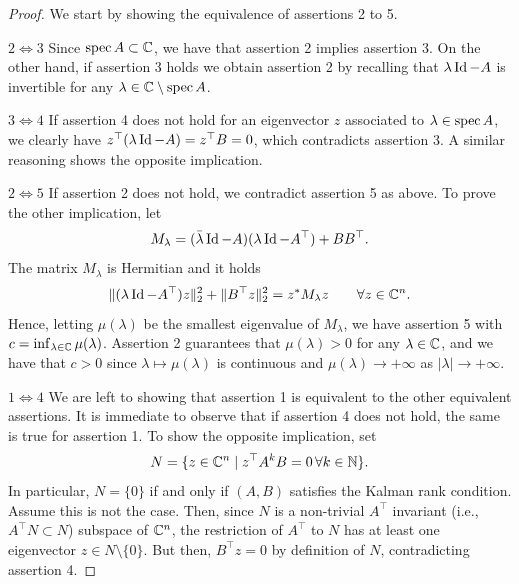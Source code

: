\begin{proof}
    We start by showing the equivalence of assertions 2 to 5.

    \emph{$2\iff 3$} Since $\operatorname{spec} A \subset \mathbb{C}$, we have that assertion 2 implies assertion 3.
    On the other hand, if assertion 3 holds we obtain assertion 2 by recalling that $\lambda\operatorname{Id} - A$ is invertible for any $\lambda \in \mathbb{C}\setminus \operatorname{spec} A$.


    \emph{$3\iff 4$}
    If assertion 4 does not hold for an eigenvector $z$ associated to $\lambda\in \operatorname{spec} A$, we clearly have $z^\top (\lambda\operatorname{Id} - A)  =z^\top B=0$, which contradicts assertion 3. A similar reasoning shows the opposite implication.

    \emph{$2\iff 5$} If assertion 2 does not hold, we contradict assertion 5 as above. To prove the other implication, let
    \begin{equation}
        M_\lambda = (\bar \lambda\operatorname{Id} - A)(\lambda \operatorname{Id} - A^\top ) + BB^\top.
    \end{equation}
    The matrix $M_\lambda$ is Hermitian and it holds
    \begin{equation}
        \label{eq:lambda-M}
        \|(\lambda\operatorname{Id} - A^\top) z \|_2^2 + \|B^\top z\|_2^2 = z^* M_\lambda z
        \qquad
        \forall z\in \mathbb{C}^n.
    \end{equation}
    Hence, letting $\mu(\lambda)$ be the smallest eigenvalue of $M_\lambda$, we have assertion 5 with $c = \inf_{\lambda \in \mathbb{C}} \mu(\lambda)$. Assertion 2 guarantees that $\mu(\lambda)>0$ for any $\lambda\in\mathbb{C}$, and we have that $c>0$ since $\lambda\mapsto \mu(\lambda)$ is continuous and $\mu(\lambda) \rightarrow + \infty$ as $|\lambda|\to +\infty$.

    \emph{$1\iff 4$}
    We are left to showing that assertion 1 is equivalent to the other equivalent assertions. 
    It is immediate to observe that if assertion 4 does not hold, the same is true for assertion 1. 
    To show the opposite implication,  set
    \begin{equation}
        N = \{ z\in\mathbb{C}^n\mid z^\top A^k B = 0\, \forall k\in \mathbb{N}\}.
    \end{equation}
    In particular, $N = \{0\}$ if and only if $(A,B)$ satisfies the Kalman rank condition. Assume this is not the case. Then, since $N$ is a non-trivial $A^\top$ invariant (i.e., $A^\top N \subset N$) subspace of $\mathbb{C}^n$, the restriction of $A^\top$ to $N$ has at least one eigenvector $z\in N\setminus\{0\}$. But then, $B^\top z=0$ by definition of $N$, contradicting assertion 4.
\end{proof}

